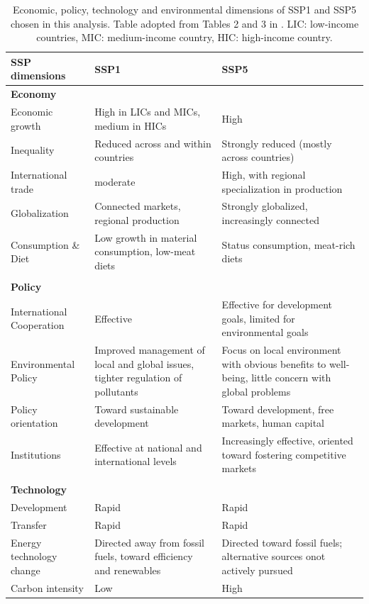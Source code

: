 \documentclass[titlesmallcaps,copyrightpage]{uomthesis}\usepackage[]{graphicx}\usepackage[]{color}
\begin{document}
\begin{table}[]
\centering
\caption{Economic, policy, technology and environmental dimensions of SSP1 and SSP5 chosen in this analysis. Table adopted from Tables 2 and 3 in \citep{oneill_roads_2017}. LIC: low-income countries, MIC: medium-income country, HIC: high-income country.}
\label{ch4:tab_oneill}
\begin{tabularx}{\textwidth}{lYY}
SSP dimensions & SSP1 & SSP5 \\
\toprule
\textbf{Economy} &  &  \\
\bottomrule
Economic growth & High in LICs and MICs, medium in HICs & High \\
Inequality & Reduced across and within countries & Strongly reduced (mostly across countries) \\
International trade & moderate & High, with regional specialization in production \\
Globalization & Connected markets, regional production & Strongly globalized, increasingly connected \\
Consumption \& Diet & Low growth in material consumption, low-meat diets & Status consumption, meat-rich diets \\
 &  &  \\
\textbf{Policy} &  &  \\
International Cooperation & Effective & Effective for development goals, limited for environmental goals \\
Environmental Policy & Improved management of local and global issues, tighter regulation of pollutants & Focus on local environment with obvious benefits to well-being, little concern with global problems \\
Policy orientation & Toward sustainable development & Toward development, free markets, human capital \\
Institutions & Effective at national and international levels & Increasingly effective, oriented toward fostering competitive markets \\
 &  &  \\
\textbf{Technology} &  &  \\
Development & Rapid & Rapid \\
Transfer & Rapid & Rapid \\
Energy technology change & Directed away from fossil fuels, toward efficiency and renewables & Directed toward fossil fuels; alternative sources onot actively pursued \\
Carbon intensity & Low & High \\

\end{tabularx}
\end{table}
\end{document}
